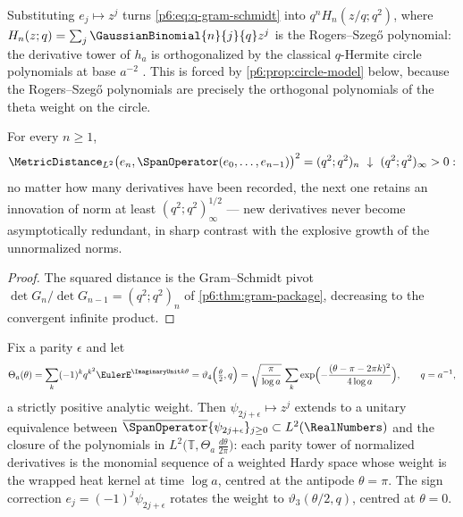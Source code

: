 \documentclass[11pt,oneside]{article}
\numberwithin{equation}{section}
\theoremstyle{definition}
\theoremstyle{remark}
\begin{document}
\begin{remark}\label{p6:rem:rogers-szegoe}
Substituting $e_j\mapsto z^j$ turns \eqref{p6:eq:q-gram-schmidt} into
$q^nH_n(z/q;q^2)$, where $H_n(z;q)=\sum_j\GaussianBinomial{n}{j}{q}z^j$ is the
Rogers--Szeg\H{o} polynomial: the derivative tower of $h_a$ is
orthogonalized by the classical $q$-Hermite circle polynomials at base
$a^{-2}$ \cite{p6:ismail}.  This is forced by \cref{p6:prop:circle-model}
below, because the Rogers--Szeg\H{o} polynomials are precisely the
orthogonal polynomials of the theta weight on the circle.
\end{remark}

\begin{corollary}\label{p6:cor:innovation-distance}
For every $n\ge1$,
\[
 \MetricDistance_{L^2}
 \bigl(e_n,\SpanOperator(e_0,\ldots,e_{n-1})\bigr)^2
 =(q^2;q^2)_n\ \downarrow\ (q^2;q^2)_\infty>0:
\]
no matter how many derivatives have been recorded, the next one retains an
innovation of norm at least $(q^2;q^2)_\infty^{1/2}$ --- new derivatives
never become asymptotically redundant, in sharp contrast with the explosive
growth of the unnormalized norms.
\end{corollary}

\begin{proof}
The squared distance is the Gram--Schmidt pivot
$\det G_n/\det G_{n-1}=(q^2;q^2)_n$ of \cref{p6:thm:gram-package},
decreasing to the convergent infinite product.
\end{proof}

\begin{proposition}
\label{p6:prop:circle-model}
Fix a parity $\epsilon$ and let
\[
 \Theta_a(\theta)
 =\sum_{k}(-1)^kq^{k^2}\EulerE^{\ImaginaryUnit k\theta}
 =\vartheta_4\Bigl(\tfrac\theta2,q\Bigr)
 =\sqrt{\frac{\pi}{\log a}}\,
 \sum_{k}\exp\Bigl(-\frac{(\theta-\pi-2\pi k)^2}{4\log a}\Bigr),
 \qquad q=a^{-1},
\]
a strictly positive analytic weight.  Then $\psi_{2j+\epsilon}\mapsto z^j$
extends to a unitary equivalence between
$\overline{\SpanOperator}\{\psi_{2j+\epsilon}\}_{j\ge0}\subset L^2(\RealNumbers)$
and the closure of the polynomials in
$L^2\bigl(\mathbb T,\Theta_a\,\frac{d\theta}{2\pi}\bigr)$: each parity tower
of normalized derivatives is the monomial sequence of a weighted Hardy space
whose weight is the wrapped heat kernel at time $\log a$, centred at the
antipode $\theta=\pi$.  The sign correction $e_j=(-1)^j\psi_{2j+\epsilon}$
rotates the weight to $\vartheta_3(\theta/2,q)$, centred at $\theta=0$.
\end{proposition}
\end{document}
